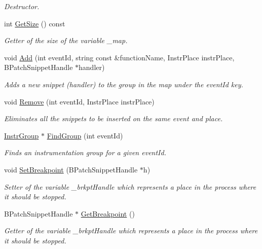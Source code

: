 \begin{DoxyCompactItemize}
\begin{DoxyCompactList}\small\item\em Destructor. \end{DoxyCompactList}\item 
int \hyperlink{class_task_instr_af86afc6744a258a4d71b5b2925fb6141}{Get\-Size} () const 
\begin{DoxyCompactList}\small\item\em Getter of the size of the variable \-\_\-map. \end{DoxyCompactList}\item 
void \hyperlink{class_task_instr_a9f3d3c2ca46842757d0ee1b21a7713cb}{Add} (int event\-Id, string const \&function\-Name, Instr\-Place instr\-Place, B\-Patch\-Snippet\-Handle $\ast$handler)
\begin{DoxyCompactList}\small\item\em Adds a new snippet (handler) to the group in the map under the event\-Id key. \end{DoxyCompactList}\item 
void \hyperlink{class_task_instr_a0edd583400eae845f2e7ca082b1607da}{Remove} (int event\-Id, Instr\-Place instr\-Place)
\begin{DoxyCompactList}\small\item\em Eliminates all the snippets to be inserted on the same event and place. \end{DoxyCompactList}\item 
\hyperlink{class_instr_group}{Instr\-Group} $\ast$ \hyperlink{class_task_instr_a291ea95979da598ccc659eae96b84afe}{Find\-Group} (int event\-Id)
\begin{DoxyCompactList}\small\item\em Finds an instrumentation group for a given event\-Id. \end{DoxyCompactList}\item 
\hypertarget{class_task_instr_a5a576d37852868d097b45f473b0c4ed5}{void \hyperlink{class_task_instr_a5a576d37852868d097b45f473b0c4ed5}{Set\-Breakpoint} (B\-Patch\-Snippet\-Handle $\ast$h)}\label{class_task_instr_a5a576d37852868d097b45f473b0c4ed5}

\begin{DoxyCompactList}\small\item\em Setter of the variable \-\_\-brkpt\-Handle which represents a place in the process where it should be stopped. \end{DoxyCompactList}\item 
B\-Patch\-Snippet\-Handle $\ast$ \hyperlink{class_task_instr_a663ce67945f6efdf6c08716e9ba038ad}{Get\-Breakpoint} ()
\begin{DoxyCompactList}\small\item\em Getter of the variable \-\_\-brkpt\-Handle which represents a place in the process where it should be stopped. \end{DoxyCompactList}\end{DoxyCompactItemize}


